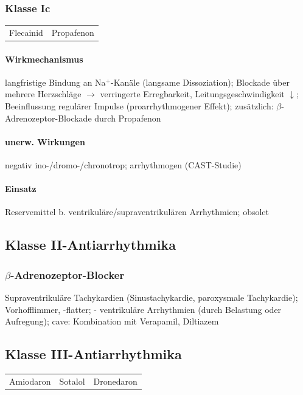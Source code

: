 \documentclass[10pt,a4paper]{report}
\begin{document}
\subsubsection{Klasse Ic}
\begin{tabularx}{\textwidth}{XX}
Flecainid&Propafenon\\ 
\end{tabularx}

\paragraph{Wirkmechanismus} langfristige Bindung an Na$^+$-Kanäle (langsame Dissoziation); Blockade über mehrere Herzschläge $\rightarrow$ verringerte Erregbarkeit, Leitungsgeschwindigkeit $\downarrow$; Beeinflussung regulärer Impulse (proarrhythmogener Effekt); zusätzlich: $\beta$-Adrenozeptor-Blockade durch Propafenon

\paragraph{unerw. Wirkungen} negativ ino-/dromo-/chronotrop; arrhythmogen (CAST-Studie)

\paragraph{Einsatz} Reservemittel b. ventrikuläre/supraventrikulären Arrhythmien; obsolet

\subsection{Klasse II-Antiarrhythmika}

\subsubsection{$\beta$-Adrenozeptor-Blocker} Supraventrikuläre Tachykardien (Sinustachykardie, paroxysmale Tachykardie); Vorhofflimmer, -flatter; - ventrikuläre Arrhythmien (durch Belastung oder Aufregung); cave: Kombination mit Verapamil, Diltiazem

\subsection{Klasse III-Antiarrhythmika}

\begin{tabularx}{\textwidth}{XXX}
Amiodaron&Sotalol&Dronedaron\\
\end{tabularx}
\end{document}
